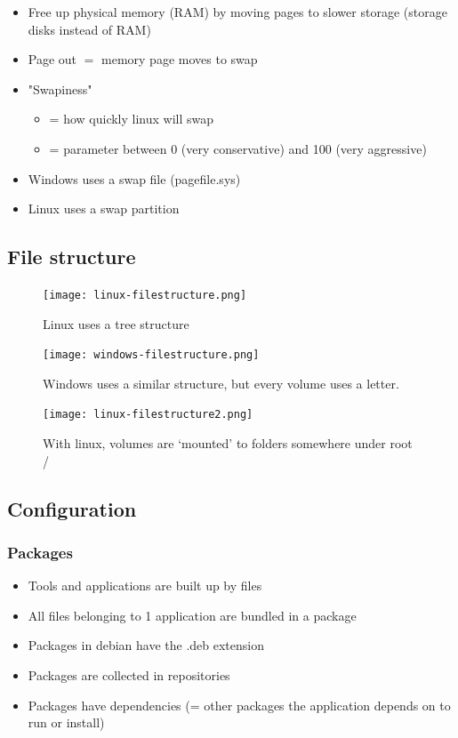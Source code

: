 \documentclass{article}
\begin{document}
\begin{itemize}
    \item Free up physical memory (RAM) by moving pages to slower storage (storage disks instead of RAM)
    \item Page out $=$ memory page moves to swap
    \item "Swapiness"
    \begin{itemize}
        \item = how quickly linux will swap
        \item = parameter between 0 (very conservative) and 100 (very aggressive)
    \end{itemize}
    \item Windows uses a swap file (pagefile.sys)
    \item Linux uses a swap partition
\end{itemize}

\subsection{File structure}

\begin{figure}[H]
    \centering
    \texttt{[image: linux-filestructure.png]}
    \caption{Linux uses a tree structure}
\end{figure}

\begin{figure}[H]
    \centering
    \texttt{[image: windows-filestructure.png]}
    \caption{Windows uses a similar structure, but every volume uses a letter.}
\end{figure}

\begin{figure}[H]
    \centering
    \texttt{[image: linux-filestructure2.png]}
    \caption{With linux, volumes are `mounted' to folders somewhere under root /}
\end{figure}

\subsection{Configuration}

\subsubsection{Packages}

\begin{itemize}
    \item Tools and applications are built up by files
    \item All files belonging to 1 application are bundled in a package
    \item Packages in debian have the .deb extension
    \item Packages are collected in repositories
    \item Packages have dependencies (= other packages the application depends on to run or install)
\end{itemize}
\end{document}

